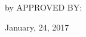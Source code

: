\newpage

{
\centering
\thesistitle
\tpbreak
by
\tpbreak
\nameanddegrees
\tpbreak
APPROVED BY: \\

\newcommand\panelist[3]{\noindent #1, #2\\\noindent(#3)\tpbreak}
\vfill
\panel
\vfill
\begin{flushright}
	January, 24, 2017
\end{flushright}
}
\pagebreak
